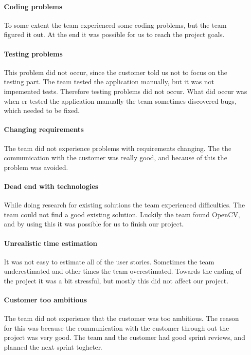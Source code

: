 \paragraph{Coding problems}
To some extent the team experienced some coding problems, but the team figured it out. At the end it was possible for us to reach the project goals. 

\paragraph{Testing problems}
This problem did not occur, since the customer told us not to focus on the testing part. The team tested the application manually, but it was not impemented tests. Therefore testing problems did not occur. What did occur was when er tested the application manually the team sometimes discovered bugs, which needed to be fixed. 
\paragraph{Changing requirements} 
The team did not experience problems with requirements changing. The the communication with the customer was really good, and because of this the problem was avoided.


\paragraph{Dead end with technologies}
While doing research for existing solutions the team experienced difficulties. The team could not find a good existing solution. Luckily the team found OpenCV, and by using this it was possible for us to finish our project. 

\paragraph{Unrealistic time estimation}
It was not easy to estimate all of the user stories. Sometimes the team underestimated and other times the team overestimated. Towards the ending of the project it was a bit stressful, but mostly this did not affect our project.

\paragraph{Customer too ambitious}
The team did not experience that the customer was too ambitious. The reason for this was because the communication with the customer through out the project was very good. The team and the customer had good sprint reviews, and planned the next sprint togheter.

